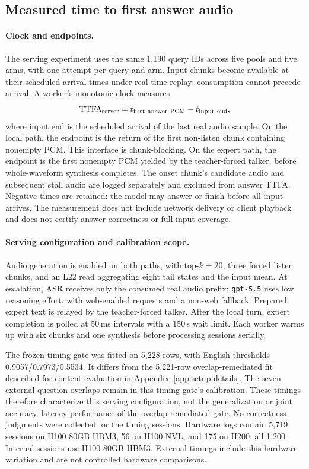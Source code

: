 \subsection{Measured time to first answer audio}
\label{app:ttfa}

\paragraph{Clock and endpoints.}
The serving experiment uses the same 1,190 query IDs across five pools
and five arms, with one attempt per query and arm. Input chunks become
available at their scheduled arrival times under real-time replay;
consumption cannot precede arrival. A worker's monotonic clock measures
\[
  \mathrm{TTFA}_{\rm server}
  = t_{\rm first\ answer\ PCM} - t_{\rm input\ end},
\]
where input end is the scheduled arrival of the last real audio sample.
On the local path, the endpoint is the return of the first non-listen
chunk containing nonempty PCM. This interface is chunk-blocking. On the
expert path, the endpoint is the first nonempty PCM yielded by the
teacher-forced talker, before whole-waveform synthesis completes.
The onset chunk's candidate audio and subsequent stall audio are logged
separately and excluded from answer TTFA. Negative times are retained:
the model may answer or finish before all input arrives. The measurement
does not include network delivery or client playback and does not certify
answer correctness or full-input coverage.

\paragraph{Serving configuration and calibration scope.}
Audio generation is enabled on both paths, with top-$k=20$, three forced
listen chunks, and an L22 read aggregating eight tail states and the
input mean. At escalation, ASR receives only the consumed real audio
prefix; \texttt{gpt-5.5} uses low reasoning effort, with web-enabled
requests and a non-web fallback. Prepared expert text is relayed by the
teacher-forced talker. After the local turn, expert completion is polled
at 50\,ms intervals with a 150\,s wait limit. Each worker warms up with
six chunks and one synthesis before processing sessions serially.

The frozen timing gate was fitted on 5,228 rows, with English thresholds
0.9057/0.7973/0.5534. It differs from the 5,221-row overlap-remediated fit
described for content evaluation in Appendix~\ref{app:setup-details}.
The seven external-question overlaps remain in this timing gate's
calibration. These timings therefore characterize this serving
configuration, not the generalization or joint accuracy--latency
performance of the overlap-remediated gate. No correctness judgments
were collected for the timing sessions. Hardware logs contain 5,719
sessions on H100 80GB HBM3, 56 on H100 NVL, and 175 on H200; all 1,200
Internal sessions use H100 80GB HBM3. External timings include this
hardware variation and are not controlled hardware comparisons.

